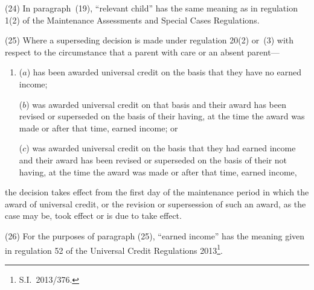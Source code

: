 \documentclass[a4paper,12pt]{article}
\begin{document}
(24) In paragraph~(19), “relevant child” has the same meaning as in regulation 1(2) of the Maintenance Assessments and Special Cases Regulations.

(25) Where a superseding decision is made under regulation 20(2) or~(3) with respect to the circumstance that a parent with care or an absent parent—
\begin{enumerate}\item[]
($a$) has been awarded universal credit on the basis that they have no earned income;

($b$) was awarded universal credit on that basis and their award has been revised or superseded on the basis of their having, at the time the award was made or after that time, earned income; or

($c$) was awarded universal credit on the basis that they had earned income and their award has been revised or superseded on the basis of their not having, at the time the award was made or after that time, earned income,
\end{enumerate}
the decision takes effect from the first day of the maintenance period in which the award of universal credit, or the revision or supersession of such an award, as the case may be, took effect or is due to take effect.

(26) For the purposes of paragraph (25), “earned income” has the meaning given in regulation 52 of the Universal Credit Regulations 2013\footnote{S.I.~2013/376.}.
\end{document}
